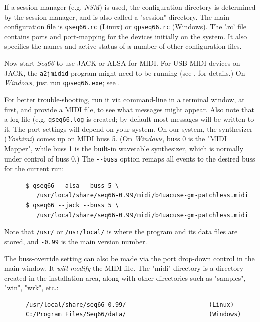    If a session manager (e.g. \textsl{NSM})
   is used, the configuration directory is determined by
   the session manager, and is also called a "session" directory.
   The main configuration file is
   \texttt{qseq66.rc} (Linux) or
   \texttt{qpseq66.rc} (Windows).
   The '.rc' file contains ports and port-mapping for the devices
   initially on the system.
   It also specifies the names and active-status
   of a number of other configuration files.

   Now start \textsl{Seq66} to use JACK or ALSA for MIDI.
   For USB MIDI devices on JACK, the \texttt{a2jmidid} program might
   need to be running
   (see , for details.)
   On \textsl{Windows}, just run \texttt{qpseq66.exe};
   see .

   For better trouble-shooting, run it via command-line in
   a terminal window, at first, and provide a MIDI file, to
   see what messages might appear.
   Also note that a log file (e.g. \texttt{qseq66.log} is created;
   by default most messages will be written to it.
   The port settings will depend on your system.
   On our system, the synthesizer (\textsl{Yoshimi}) comes up on MIDI buss 5.
   (On \textsl{Windows}, buss 0 is the "MIDI Mapper", while buss 1 is the
   built-in wavetable synthesizer, which is normally under control of buss 0.)
   The \texttt{-{}-buss} option remaps all events to the desired buss for
   the current run:

   \begin{verbatim}
      $ qseq66 --alsa --buss 5 \
         /usr/local/share/seq66-0.99/midi/b4uacuse-gm-patchless.midi
      $ qseq66 --jack --buss 5 \
         /usr/local/share/seq66-0.99/midi/b4uacuse-gm-patchless.midi
   \end{verbatim}

   Note that \texttt{/usr/} or \texttt{/usr/local/}
   is where the program and its data files
   are stored, and \texttt{-0.99} is the main version number.

   The buss-override setting can also be made via the port drop-down control
   in the main window.
   It \textsl{will modify} the MIDI file.
   The "midi" directory is a directory created in the installation area,
   along with other directories such as "samples", "win", "wrk", etc.:

   \begin{verbatim}
      /usr/local/share/seq66-0.99/                       (Linux)
      C:/Program Files/Seq66/data/                       (Windows)
   \end{verbatim}

